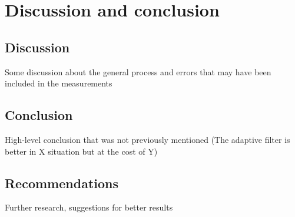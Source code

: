 \chapter{Discussion and conclusion}
\section{Discussion}
Some discussion about the general process and errors that may have been included in the measurements
\section{Conclusion}
High-level conclusion that was not previously mentioned (The adaptive filter is better in X situation but at the cost of Y)
\section{Recommendations}
Further research, suggestions for better results